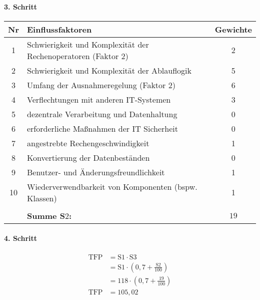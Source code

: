 \begin{landscape}
\begin{minipage}{0.7\textwidth}
		\paragraph{3. Schritt}
		\begin{center}
			\begin{tabular}{|c|l|c|}
				\hline
				Nr & Einflussfaktoren & Gewichte\\
				\hline
				1 & Schwierigkeit und Komplexität der Rechenoperatoren (Faktor 2) & 2\\
				2 & Schwierigkeit und Komplexität der Ablauflogik & 5\\
				3 & Umfang der Ausnahmeregelung (Faktor 2) & 6\\
				4 & Verflechtungen mit anderen IT-Systemen & 3\\
				5 & dezentrale Verarbeitung und Datenhaltung & 0\\
				6 & erforderliche Maßnahmen der IT Sicherheit & 0\\
				7 & angestrebte Rechengeschwindigkeit & 1\\
				8 & Konvertierung der Datenbeständen & 0\\
				9 & Benutzer- und Änderungsfreundlichkeit & 1\\
				10 & Wiederverwendbarkeit von Komponenten (bspw. Klassen) & 1\\
				\hline
				\multicolumn{3}{c}{}\\
				\cline{2-3}
			    \multicolumn{1}{c}{} & \multicolumn{1}{|l|}{{\bf Summe S$2$:}} & $19$\\
				\cline{2-3} 
			\end{tabular}
		\end{center}
	\end{minipage}
\end{landscape}

\paragraph{4. Schritt}
\begin{align*}
	\text{TFP} &= \text{S}1 \cdot \text{S}3\\
			   &= \text{S}1 \cdot \left(0{,}7 + \frac{\text{S}2}{100}\right)\\
			   &= 118 \cdot \left( 0{,}7 + \frac{19}{100}\right)\\
	\text{TFP} &= 105{,}02\\
\end{align*}
